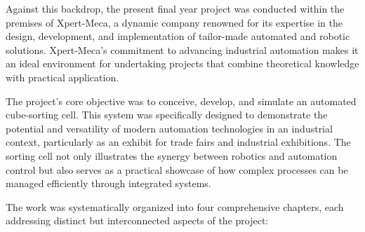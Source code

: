 Against this backdrop, the present final year project was conducted within the premises of Xpert-Meca, a dynamic company renowned for its expertise in the design, development, and implementation of tailor-made automated and robotic solutions. Xpert-Meca’s commitment to advancing industrial automation makes it an ideal environment for undertaking projects that combine theoretical knowledge with practical application.


The project’s core objective was to conceive, develop, and simulate an automated cube-sorting cell. This system was specifically designed to demonstrate the potential and versatility of modern automation technologies in an industrial context, particularly as an exhibit for trade fairs and industrial exhibitions. The sorting cell not only illustrates the synergy between robotics and automation control but also serves as a practical showcase of how complex processes can be managed efficiently through integrated systems.

The work was systematically organized into four comprehensive chapters, each addressing distinct but interconnected aspects of the project:



